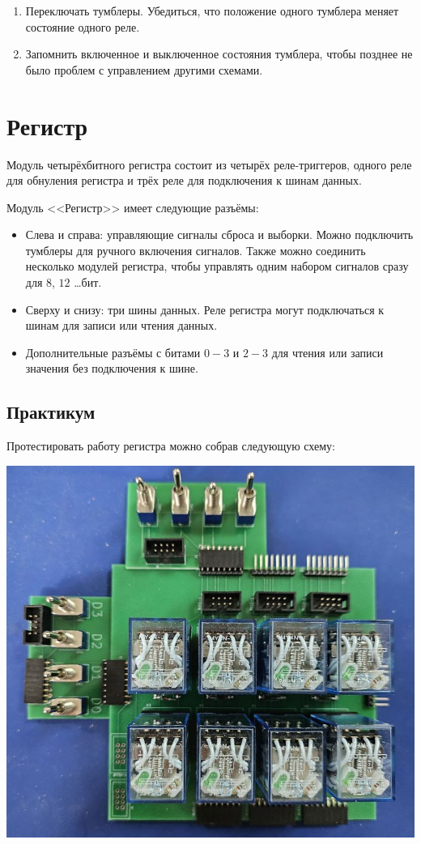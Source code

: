 \documentclass{book}
\begin{document}
\begin{enumerate}
    \item Переключать тумблеры. Убедиться, что положение одного тумблера меняет состояние одного реле.
    \item Запомнить включенное и выключенное состояния тумблера, чтобы позднее не было проблем с управлением другими схемами.
\end{enumerate}

\section{Регистр}

Модуль четырёхбитного регистра состоит из четырёх реле-триггеров,
одного реле для обнуления регистра и трёх реле для подключения
к шинам данных.

Модуль <<Регистр>> имеет следующие разъёмы:
\begin{itemize}
  \item Слева и справа: управляющие сигналы сброса и выборки.
        Можно подключить тумблеры
        для ручного включения сигналов. Также можно соединить несколько
        модулей регистра, чтобы управлять одним набором сигналов сразу
        для $8$, $12$ \ldots бит.
  \item Сверху и снизу: три шины данных. Реле регистра могут
        подключаться к шинам для записи или чтения данных.
  \item Дополнительные разъёмы с битами $0-3$ и $2-3$ для чтения или
        записи значения без подключения к шине.
\end{itemize}

\subsection{Практикум}

Протестировать работу регистра можно собрав следующую схему:

\includegraphics[width=\columnwidth]{photo/register.jpg}
\end{document}
